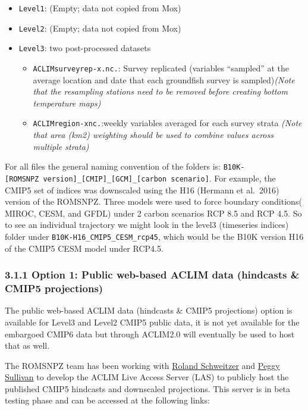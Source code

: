 \documentclass[
]{article}
\providecommand{\tightlist}{%
  \setlength{\itemsep}{0pt}\setlength{\parskip}{0pt}}
\begin{document}
\begin{itemize}
\tightlist
\item
  \texttt{Level1}: (Empty; data not copied from Mox)
\item
  \texttt{Level2}: (Empty; data not copied from Mox)
\item
  \texttt{Level3}: two post-processed datasets

  \begin{itemize}
  \tightlist
  \item
    \texttt{ACLIMsurveyrep-x.nc.}: Survey replicated (variables
    ``sampled'' at the average location and date that each groundfish
    survey is sampled)\emph{(Note that the resampling stations need to
    be removed before creating bottom temperature maps)}\\
  \item
    \texttt{ACLIMregion-xnc.}:weekly variables averaged for each survey
    strata \emph{(Note that area (km2) weighting should be used to
    combine values across multiple strata)}
  \end{itemize}
\end{itemize}

For all files the general naming convention of the folders is:
\texttt{B10K-{[}ROMSNPZ\ version{]}\_{[}CMIP{]}\_{[}GCM{]}\_{[}carbon\ scenario{]}}.
For example, the CMIP5 set of indices was downscaled using the H16
(Hermann et al.~2016) version of the ROMSNPZ. Three models were used to
force boundary conditions( MIROC, CESM, and GFDL) under 2 carbon
scenarios RCP 8.5 and RCP 4.5. So to see an individual trajectory we
might look in the level3 (timeseries indices) folder under
\texttt{B10K-H16\_CMIP5\_CESM\_rcp45}, which would be the B10K version
H16 of the CMIP5 CESM model under RCP4.5.

\hypertarget{option-1-public-web-based-aclim-data-hindcasts-cmip5-projections}{%
\subsubsection{3.1.1 Option 1: Public web-based ACLIM data (hindcasts \&
CMIP5
projections)}\label{option-1-public-web-based-aclim-data-hindcasts-cmip5-projections}}

The public web-based ACLIM data (hindcasts \& CMIP5 projections) option
is available for Level3 and Level2 CMIP5 public data, it is not yet
available for the embargoed CMIP6 data but through ACLIM2.0 will
eventually be used to host that as well.

The ROMSNPZ team has been working with
\href{roland.schweitzer@noaa.gov}{Roland Schweitzer} and
\href{peggy.sullivan@noaa.gov}{Peggy Sullivan} to develop the ACLIM Live
Access Server (LAS) to publicly host the published CMIP5 hindcasts and
downscaled projections. This server is in beta testing phase and can be
accessed at the following links:
\end{document}

